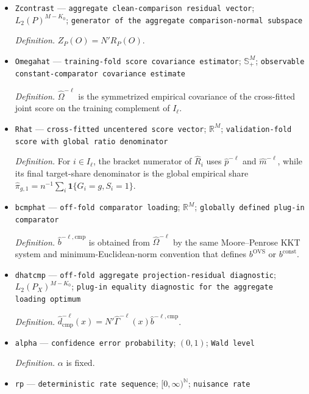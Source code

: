 \documentclass{article}
\begin{document}
\begin{itemize}
  \item \texttt{Zcontrast} --- \texttt{aggregate clean-\allowbreak{}comparison residual vector}; \(L_2(P)^{M-K_0}\); \texttt{generator of the aggregate comparison-\allowbreak{}normal subspace}
  \par\smallskip\noindent\emph{Definition.} \(Z_P(O)=N'R_P(O)\).
  \item \texttt{Omegahat} --- \texttt{training-\allowbreak{}fold score covariance estimator}; \(\mathbb S_+^M\); \texttt{observable constant-\allowbreak{}comparator covariance estimate}
  \par\smallskip\noindent\emph{Definition.} \(\widehat\Omega^{-\ell}\) is the symmetrized empirical covariance of the cross-fitted joint score on the training complement of \(I_\ell\).
  \item \texttt{Rhat} --- \texttt{cross-\allowbreak{}fitted uncentered score vector}; \(\mathbb R^M\); \texttt{validation-\allowbreak{}fold score with global ratio denominator}
  \par\smallskip\noindent\emph{Definition.} For \(i\in I_\ell\), the bracket numerator of \(\widehat R_i\) uses \(\widehat p^{-\ell}\) and \(\widehat m^{-\ell}\), while its final target-share denominator is the global empirical share \(\widehat\pi_{g,1}=n^{-1}\sum_i\mathbf 1\{G_i=g,S_i=1\}\).
  \item \texttt{bcmphat} --- \texttt{off-\allowbreak{}fold comparator loading}; \(\mathbb R^M\); \texttt{globally defined plug-\allowbreak{}in comparator}
  \par\smallskip\noindent\emph{Definition.} \(\widehat b^{-\ell,\mathrm{cmp}}\) is obtained from \(\widehat\Omega^{-\ell}\) by the same Moore--Penrose KKT system and minimum-Euclidean-norm convention that defines \(b^{\mathrm{OVS}}\) or \(b^{\mathrm{const}}\).
  \item \texttt{dhatcmp} --- \texttt{off-\allowbreak{}fold aggregate projection-\allowbreak{}residual diagnostic}; \(L_2(P_X)^{M-K_0}\); \texttt{plug-\allowbreak{}in equality diagnostic for the aggregate loading optimum}
  \par\smallskip\noindent\emph{Definition.} \(\widehat d^{-\ell}_{\mathrm{cmp}}(x)=N'\widehat\Gamma^{-\ell}(x)\widehat b^{-\ell,\mathrm{cmp}}\).
  \item \texttt{alpha} --- \texttt{confidence error probability}; \((0,1)\); \texttt{Wald level}
  \par\smallskip\noindent\emph{Definition.} \(\alpha\) is fixed.
  \item \texttt{rp} --- \texttt{deterministic rate sequence}; \([0,\infty)^{\mathbb N}\); \texttt{nuisance rate}

\end{itemize}
\end{document}
